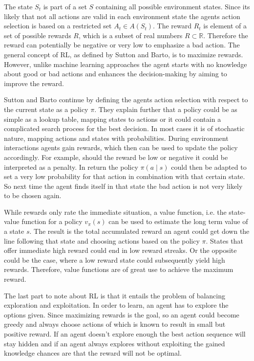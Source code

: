 The state $S_t$ is part of a set $S$ containing all possible environment states. Since its likely that not all actions are valid in each environment state the agents action selection is based on a restricted set $A_t\in A(S_t)$. The reward $R_t$ is element of a set of possible rewards $R$, which is a subset of real numbers $R \subset \mathbb{R}$. Therefore the reward can potentially be negative or very low to emphasize a bad action. The general concept of RL, as defined by Sutton and Barto, is to maximize rewards. However, unlike machine learning approaches the agent starts with no knowledge about good or bad actions and enhances the decision-making by aiming to improve the reward.

Sutton and Barto continue by defining the agents action selection with respect to the current state as a policy $\pi$. They explain further that a policy could be as simple as a lookup table, mapping states to actions or it could contain a complicated search process for the best decision. In most cases it is of stochastic nature, mapping actions and states with probabilities. During environment interactions agents gain rewards, which then can be used to update the policy accordingly. For example, should the reward be low or negative it could be interpreted as a penalty. In return the policy $\pi(a \mid s)$ could then be adapted to set a very low probability for that action in combination with that certain state. So next time the agent finds itself in that state the bad action is not very likely to be chosen again.

While rewards only rate the immediate situation, a value function, i.e. the state-value function for a policy $v_{\pi}(s)$ can be used to estimate the long term value of a state $s$. The result is the total accumulated reward an agent could get down the line following that state and choosing actions based on the policy $\pi$. States that offer immediate high reward could end in
low reward streaks. Or the opposite could be the case, where a low reward state could subsequently yield high rewards. Therefore, value functions are of great use to achieve the maximum reward.

The last part to note about RL is that it entails the problem of balancing exploration and exploitation. In order to learn, an agent has to explore the options given. Since maximizing rewards is the goal, so an agent could become greedy and always choose actions of which is known to result in small but positive reward. If an agent doesn't explore enough the best action sequence will stay hidden and if an agent always explores without exploiting the gained knowledge chances are that the reward will not be optimal.

